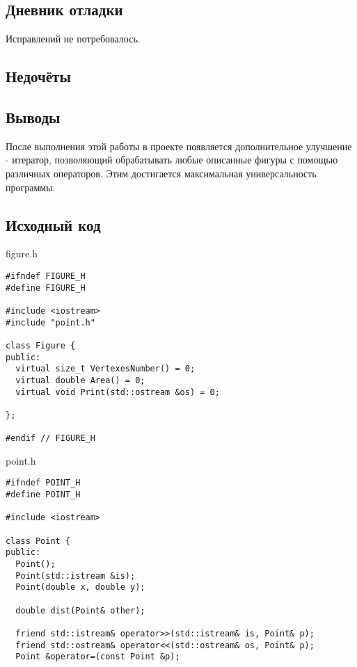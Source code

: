 \documentclass[12pt]{article}
\begin{document}
{\begin{enumerate}
\end{enumerate}

\subsection*{Дневник отладки}
Исправлений не потребовалось.


\subsection*{Недочёты}


\subsection*{Выводы}
После выполнения этой работы в проекте появляется дополнительное улучшение - итератор, позволяющий обрабатывать любые описанные фигуры с помощью различных операторов. Этим достигается максимальная универсальность программы.

\vfill

\subsection*{Исходный код}

{\Huge figure.h}
\begin{verbatim}
#ifndef FIGURE_H
#define FIGURE_H

#include <iostream>
#include "point.h"

class Figure {
public:
  virtual size_t VertexesNumber() = 0;
  virtual double Area() = 0;
  virtual void Print(std::ostream &os) = 0;

};

#endif // FIGURE_H

\end{verbatim}
    \pagebreak

\begin{flushleft}
{\Huge point.h}
\begin{verbatim}
#ifndef POINT_H
#define POINT_H

#include <iostream>

class Point {
public:
  Point();
  Point(std::istream &is);
  Point(double x, double y);

  double dist(Point& other);
  
  friend std::istream& operator>>(std::istream& is, Point& p);
  friend std::ostream& operator<<(std::ostream& os, Point& p);
  Point &operator=(const Point &p);


\end{verbatim}
\end{flushleft}}
\end{document}
